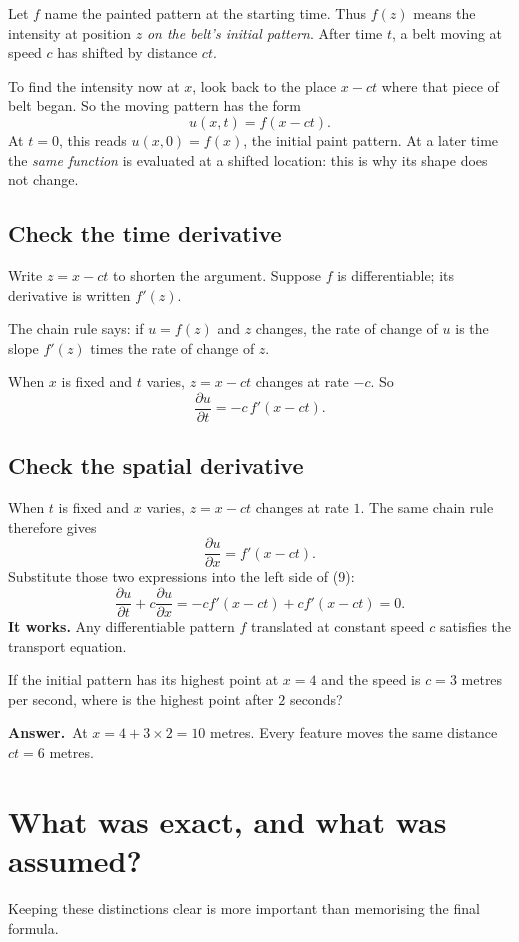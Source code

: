 \documentclass[11pt,a4paper]{article}
\newcommand{\secstart}[1]{\Needspace{7\baselineskip}\section{#1}}
\newcommand{\substart}[1]{\Needspace{5\baselineskip}\subsection{#1}}
\newcommand{\answer}{\par\smallskip\textbf{Answer.}~}
\begin{document}
Let $f$ name the painted pattern at the starting time. Thus $f(z)$ means the intensity at position $z$ \emph{on the belt's initial pattern}. After time $t$, a belt moving at speed $c$ has shifted by distance $ct$.

To find the intensity now at $x$, look back to the place $x-ct$ where that piece of belt began. So the moving pattern has the form
\begin{equation}
\boxed{u(x,t)=f(x-ct).}\tag{10}
\end{equation}
At $t=0$, this reads $u(x,0)=f(x)$, the initial paint pattern. At a later time the \emph{same function} is evaluated at a shifted location: this is why its shape does not change.

\substart{Check the time derivative}
Write $z=x-ct$ to shorten the argument. Suppose $f$ is differentiable; its derivative is written $f'(z)$.

The chain rule says: if $u=f(z)$ and $z$ changes, the rate of change of $u$ is the slope $f'(z)$ times the rate of change of $z$.

When $x$ is fixed and $t$ varies, $z=x-ct$ changes at rate $-c$. So
\[
\frac{\partial u}{\partial t}=-c\,f'(x-ct).
\]
\substart{Check the spatial derivative}
When $t$ is fixed and $x$ varies, $z=x-ct$ changes at rate $1$. The same chain rule therefore gives
\[
\frac{\partial u}{\partial x}=f'(x-ct).
\]
Substitute those two expressions into the left side of (9):
\[
\frac{\partial u}{\partial t}+c\frac{\partial u}{\partial x}
= -c f'(x-ct)+c f'(x-ct)=0.
\]
\textbf{It works.} Any differentiable pattern $f$ translated at constant speed $c$ satisfies the transport equation.

\begin{thinkbox}
If the initial pattern has its highest point at $x=4$ and the speed is $c=3$ metres per second, where is the highest point after $2$ seconds?
\answer At $x=4+3\times2=10$ metres. Every feature moves the same distance $ct=6$ metres.
\end{thinkbox}

\clearpage
\secstart{What was exact, and what was assumed?}
Keeping these distinctions clear is more important than memorising the final formula.
\end{document}
